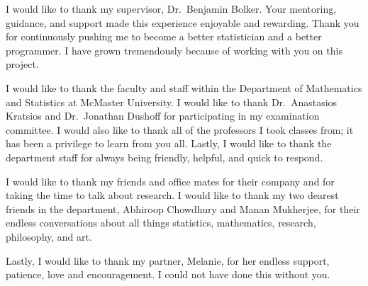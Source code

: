 \documentclass[
11pt, %
oneside, %
english, %
singlespacing, %
]{macthesis} %
\def\blankpage{%
      \clearpage%
      \thispagestyle{empty}%
      \addtocounter{page}{-1}%
      \null%
      \clearpage}
\begin{document}
  \begin{acknowledgements}
  \addchaptertocentry{\acknowledgementname} %
    I would like to thank my supervisor, Dr.~Benjamin Bolker. Your mentoring, guidance, and support made this experience enjoyable and rewarding. Thank you for continuously pushing me to become a better statistician and a better programmer. I have grown tremendously because of working with you on this project.

    I would like to thank the faculty and staff within the Department of Mathematics and Statistics at McMaster University. I would like to thank Dr.~Anastasios Kratsios and Dr.~Jonathan Dushoff for participating in my examination committee. I would also like to thank all of the professors I took classes from; it has been a privilege to learn from you all. Lastly, I would like to thank the department staff for always being friendly, helpful, and quick to respond.

    I would like to thank my friends and office mates for their company and for taking the time to talk about research. I would like to thank my two dearest friends in the department, Abhiroop Chowdhury and Manan Mukherjee, for their endless conversations about all things statistics, mathematics, research, philosophy, and art.

    Lastly, I would like to thank my partner, Melanie, for her endless support, patience, love and encouragement. I could not have done this without you.
  \end{acknowledgements}
\blankpage
\clearpage


\tableofcontents %

\listoffigures %

\listoftables %

\end{document}
